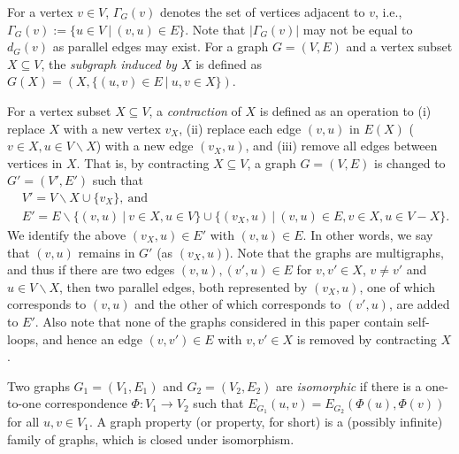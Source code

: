 \documentclass[11pt]{article}
\begin{document}
For a vertex $v \in V$, $\Gamma_G(v)$ denotes the set of vertices adjacent to $v$, 
i.e., $\Gamma_G(v) := \{ u \in V ~|~ (v,u) \in E \}$. 
Note that $|\Gamma_G (v)|$ may not be equal to $d_G(v)$ 
as parallel edges may exist. 
For a graph $G = (V,E)$ 
and a vertex subset $X \subseteq V$, 
the {\em subgraph induced by $X$} is 
defined as $G(X) = (X, \{ (u,v) \in E ~|~ u,v \in X \} )$. 




For a vertex subset $X \subseteq V$, 
a {\em contraction} of $X$ is defined as 
an operation to 
(i) replace $X$ with a new vertex $v_X$, 
(ii) replace each edge $(v,u)$ in $E(X)$ ($v \in X, u \in V \backslash X$) with 
a new edge $(v_X,u)$, and 
(iii) remove all edges between vertices in $X$. 
That is, by contracting $X \subseteq V$, 
a graph $G=(V,E)$ is changed to $G'=(V',E')$ such that 
\begin{eqnarray*}
&V' = V \backslash X \cup \{ v_X \}, ~\mbox{and}& \\
&E' = E \backslash \{ (v,u) ~|~ v \in X, u \in V \} \cup 
\{ (v_X,u) ~|~ (v,u) \in E, v \in X, u \in V-X \}. &
\end{eqnarray*}
We identify the above $(v_X,u) \in E'$ with $(v,u) \in E$. 
In other words, we say that $(v,u)$ remains in $G'$ (as $(v_X,u)$). 
Note that the graphs are multigraphs, and thus if there are two edges $(v,u),(v',u) \in E$ for $v,v' \in X$, $v \neq v'$ and $u \in V \backslash X$, 
then two parallel edges, both represented by $(v_X,u)$, 
one of which corresponds to $(v,u)$ and 
the other of which corresponds to $(v',u)$, are added to $E'$. 
Also note that none of the graphs considered in this paper contain self-loops, and hence 
an edge $(v,v') \in E$ with $v,v' \in X$ is removed by contracting $X$. 




Two graphs $G_1 =(V_1, E_1)$ and $G_2 =(V_2, E_2)$ 
are {\em isomorphic} if there is a one-to-one correspondence 
$\Phi: V_1 \to V_2$ 
such that $E_{G_1}(u,v) = E_{G_2}(\Phi(u), \Phi(v))$ 
for all $u,v \in V_1$. 
A graph property (or property, for short) is a (possibly infinite) 
family of graphs,  
which is closed under isomorphism.  
\end{document}
